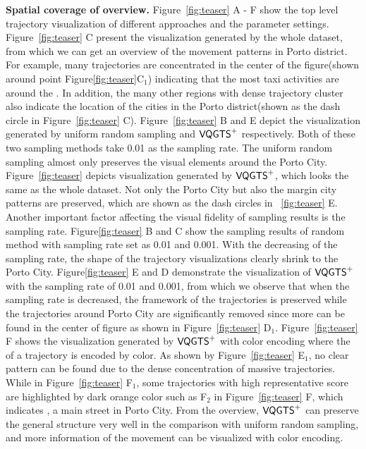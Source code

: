 \textbf{Spatial coverage of overview.}
Figure~\ref{fig:teaser} A - F show the top level trajectory visualization of different approaches and the parameter settings. Figure~\ref{fig:teaser} C present the visualization generated by the whole dataset, from which we can get an overview of the movement patterns in Porto district. For example, many trajectories are concentrated in the center of the figure(shown around point Figure\ref{fig:teaser}C$_1$) indicating that the most taxi activities are around the . In addition, the many other regions with dense trajectory cluster also indicate the location of the cities in the Porto district(shown as the dash circle in Figure~\ref{fig:teaser} C). Figure~\ref{fig:teaser} B and E depict the visualization generated by uniform random sampling and $\mathsf{VQGTS}^{+}$ respectively. Both of these two sampling methods take 0.01 as the sampling rate. The uniform random sampling almost only preserves the visual elements around the Porto City. Figure~\ref{fig:teaser} depicts visualization generated by $\mathsf{VQGTS}^{+}$, which looks the same as the whole dataset. Not only the Porto City but also the margin city patterns are preserved, which are shown as the dash circles in ~\ref{fig:teaser} E. Another important factor affecting the visual fidelity of sampling results is the sampling rate. Figure\ref{fig:teaser} B and C show the sampling results of random method with sampling rate set as 0.01 and 0.001. With the decreasing of the sampling rate, the shape of the trajectory visualizations clearly shrink to the Porto City. Figure\ref{fig:teaser} E and D demonstrate the visualization of $\mathsf{VQGTS}^{+}$ with the sampling rate of 0.01 and 0.001, from which we observe that when the sampling rate is decreased, the framework of the trajectories is preserved while the trajectories around Porto City are significantly removed since more  can be found in the center of figure as shown in Figure~\ref{fig:teaser} D$_1$. Figure~\ref{fig:teaser} F shows the visualization generated by $\mathsf{VQGTS}^{+}$ with color encoding where the  of a trajectory is encoded by color. As shown by Figure~\ref{fig:teaser} E$_1$, no clear pattern can be found due to the dense concentration of massive trajectories. While in Figure~\ref{fig:teaser} F$_1$, some trajectories with high representative score are highlighted by dark orange color such as F$_2$ in Figure~\ref{fig:teaser} F, which indicates , a main street in Porto City. From the overview, $\mathsf{VQGTS}^{+}$ can preserve the general structure very well in the comparison with uniform random sampling, and more information of the movement can be visualized with color encoding.

